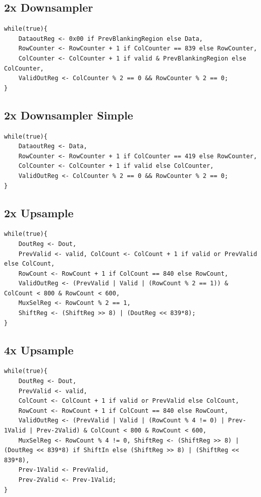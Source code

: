 \documentclass[11pt]{article}
\begin{document}
\subsection*{2x Downsampler}
\begin{lstlisting}
while(true){
    DataoutReg <- 0x00 if PrevBlankingRegion else Data,
    RowCounter <- RowCounter + 1 if ColCounter == 839 else RowCounter,
    ColCounter <- ColCounter + 1 if valid & PrevBlankingRegion else ColCounter,
    ValidOutReg <- ColCounter % 2 == 0 && RowCounter % 2 == 0;
}
\end{lstlisting}

\subsection*{2x Downsampler Simple}
\begin{lstlisting}
while(true){
    DataoutReg <- Data,
    RowCounter <- RowCounter + 1 if ColCounter == 419 else RowCounter,
    ColCounter <- ColCounter + 1 if valid else ColCounter,
    ValidOutReg <- ColCounter % 2 == 0 && RowCounter % 2 == 0;
}
\end{lstlisting}

\subsection*{2x Upsample}
\begin{lstlisting}
while(true){
    DoutReg <- Dout, 
    PrevValid <- valid, ColCount <- ColCount + 1 if valid or PrevValid else ColCount, 
    RowCount <- RowCount + 1 if ColCount == 840 else RowCount, 
    ValidOutReg <- (PrevValid | Valid | (RowCount % 2 == 1)) & ColCount < 800 & RowCount < 600, 
    MuxSelReg <- RowCount % 2 == 1, 
    ShiftReg <- (ShiftReg >> 8) | (DoutReg << 839*8);
}
\end{lstlisting}

\subsection*{4x Upsample}
\begin{lstlisting}
while(true){
    DoutReg <- Dout, 
    PrevValid <- valid, 
    ColCount <- ColCount + 1 if valid or PrevValid else ColCount, 
    RowCount <- RowCount + 1 if ColCount == 840 else RowCount, 
    ValidOutReg <- (PrevValid | Valid | (RowCount % 4 != 0) | Prev-1Valid | Prev-2Valid) & ColCount < 800 & RowCount < 600, 
    MuxSelReg <- RowCount % 4 != 0, ShiftReg <- (ShiftReg >> 8) | (DoutReg << 839*8) if ShiftIn else (ShiftReg >> 8) | (ShiftReg << 839*8), 
    Prev-1Valid <- PrevValid, 
    Prev-2Valid <- Prev-1Valid;
}
\end{lstlisting}
\end{document}
